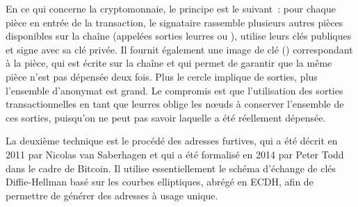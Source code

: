En ce qui concerne la cryptomonnaie, le principe est le suivant~: pour chaque pièce en entrée de la transaction, le signataire rassemble plusieurs autres pièces disponibles sur la chaîne (appelées sorties leurres ou ), utilise leurs clés publiques et signe avec sa clé privée. Il fournit également une image de clé () correspondant à la pièce, qui est écrite sur la chaîne et qui permet de garantir que la même pièce n'est pas dépensée deux fois. Plus le cercle implique de sorties, plus l'ensemble d'anonymat est grand. Le compromis est que l'utilisation des sorties transactionnelles en tant que leurres oblige les nœuds à conserver l'ensemble de ces sorties, puisqu'on ne peut pas savoir laquelle a été réellement dépensée.



La deuxième technique est le procédé des adresses furtives, qui a été décrit en 2011 par Nicolas van Saberhagen et qui a été formalisé en 2014 par Peter Todd dans le cadre de Bitcoin. Il utilise essentiellement le schéma d'échange de clés Diffie-Hellman basé sur les courbes elliptiques, abrégé en ECDH, afin de permettre de générer des adresses à usage unique.

